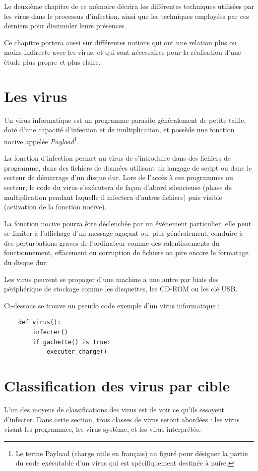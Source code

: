 
Le deuxième chapitre de ce mémoire décrira les différentes techniques utilisées par les virus 
dans le processus d'infection, ainsi que les techniques employées par ces derniers pour dissimuler leurs présences.

Ce chapitre portera aussi sur différentes notions qui ont une relation plus ou moins indirecte avec les virus,
et qui sont nécessaires pour la réalisation d'une étude plus propre et plus claire. %

\newpage

\section{Les virus} 
Un virus informatique est un programme parasite généralement de petite taille, 
doté d’une capacité d’infection et de multiplication, et possède une fonction nocive appelée 
\emph{Payload}\footnote{Le terme Payload (charge utile en français) au figuré pour désigner 
la partie du code exécutable d'un virus qui est spécifiquement destinée à nuire.}.

La fonction d'infection permet au virus de s'introduire dans des fichiers de programme, 
dans des fichiers de données utilisant un langage de script ou dans le secteur de démarrage 
d’un disque dur. Lors de l'accès à ces programmes ou secteur, le code du virus s'exécutera de 
façon d'abord silencieuse (phase de multiplication pendant laquelle il infectera d'autres fichiers) 
puis visible (activation de la fonction nocive). %

La fonction nocive pourra être déclenchée par un événement particulier, elle peut se limiter 
à l'affichage d'un message agaçant ou, plus généralement, conduire à des perturbations graves 
de l'ordinateur comme des ralentissements du fonctionnement, effacement ou corruption de 
fichiers ou pire encore le formatage du disque dur. \cite{virus_informatique} %

Les virus peuvent se propager d'une machine a une autre par biais des périphérique de stockage comme les disquettes, 
les CD-ROM ou les clé USB.

Ci-dessous se trouve un pseudo code exemple d'un virus informatique :
\begin{verbatim}
    def virus():
        infecter()
        if gachette() is True:
            executer_charge()
\end{verbatim}


\section{Classification des virus par cible}
L'un des moyens de classifications des virus est de voir ce qu'ils essayent d'infecter.
Dans cette section, trois classes de virus seront abordées : les virus visant les programmes, les virus système,
et les virus interprétés. %

